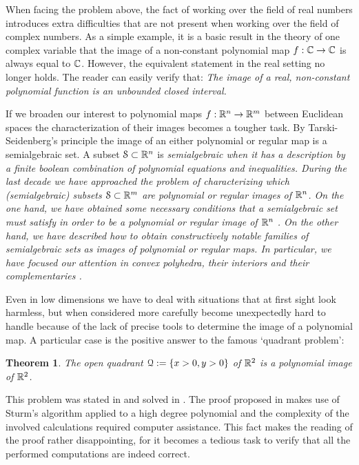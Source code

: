 \documentclass[1p]{elsarticle}
\newtheorem{thm}{Theorem}
\newcommand{\Ss}{{\EuScript S}}
\newcommand{\Qq}{{\EuScript Q}}
\begin{document}
When facing the problem above, the fact of working over the field of real numbers introduces extra difficulties that are not present when working over the field of complex numbers. As a simple example, it is a basic result in the theory of one complex variable that the image of a non-constant polynomial map $f:{\mathbb C}\to{\mathbb C}$ is always equal to ${\mathbb C}$. However, the equivalent statement in the real setting no longer holds. The reader can easily verify that: {\it The image of a real, non-constant polynomial function is an unbounded closed interval.}

If we broaden our interest to polynomial maps $f:{\mathbb R}^n\to{\mathbb R}^m$ between Euclidean spaces the characterization of their images becomes a tougher task. By Tarski-Seidenberg's principle \citep[1.4]{bcr} the image of an either polynomial or regular map is a semialgebraic set. A subset $\Ss\subset\R^n$ is \em semialgebraic \em when it has a description by a finite boolean combination of polynomial equations and inequalities. During the last decade we have approached the problem of characterizing which (semialgebraic) subsets $\Ss\subset\R^m$ are polynomial or regular images of ${\mathbb R}^n$. On the one hand, we have obtained some necessary conditions that a semialgebraic set must satisfy in order to be a polynomial or regular image of ${\mathbb R}^n$  \citep{f1,fg1,fg2,fu1}. On the other hand, we have described how to obtain constructively notable families of semialgebraic sets as images of polynomial or regular maps. In particular, we have focused our attention in convex polyhedra, their interiors and their complementaries \citep{fgu1,fu2,fu3,u2}.

Even in low dimensions we have to deal with situations that at first sight look harmless, but when considered more carefully become unexpectedly hard to handle because of the lack of precise tools to determine the image of a polynomial map. A particular case is the positive answer to the famous `quadrant problem':
\begin{thm}\label{quad}
The open quadrant $\Qq:=\{x>0,y>0\}$ of ${\mathbb R}^2$ is a polynomial image of ${\mathbb R}^2$.
\end{thm}
This problem was stated in \citet{g} and solved in \citet{fg1}. The proof proposed in \citet{fg1} makes use of Sturm's algorithm applied to a high degree polynomial and the complexity of the involved calculations required computer assistance. This fact makes the reading of the proof rather disappointing, for it becomes a tedious task to verify that all the performed computations are indeed correct.  
\end{document}

